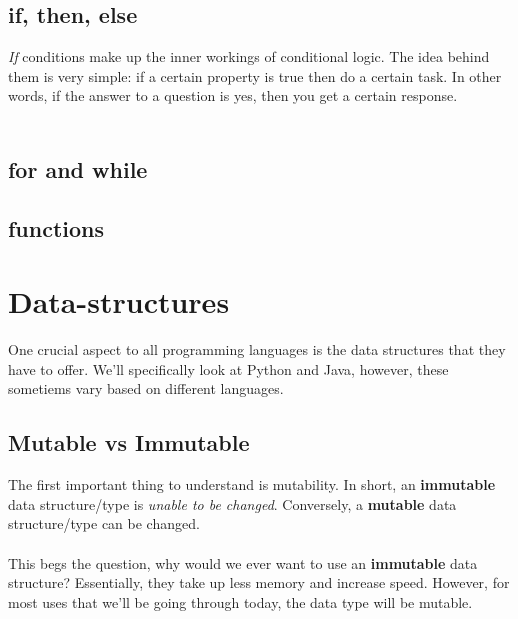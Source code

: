 \documentclass[12pt,a4paper]{book}
\begin{document}
		\section{if, then, else}
			\textit{If} conditions make up the inner workings of conditional logic. The idea behind them is very simple: if a certain property is true then do a certain task. In other words, if the answer to a question is yes, then you get a certain response.
			\\\\
		\section{for and while}
		\section{functions}
		
	\chapter{Data-structures}  \label{chap:datastructures}
		One crucial aspect to all programming languages is the data structures that they have to offer. We'll specifically look at Python and Java, however, these sometiems vary based on different  languages.
		\section{Mutable vs Immutable}
			The first important thing to understand is mutability. In short, an \textbf{immutable} data structure/type is \textit{unable to be changed}. Conversely, a \textbf{mutable} data structure/type can be changed.
			\\\\
			This begs the question, why would we ever want to use an \textbf{immutable} data structure? Essentially, they take up less memory and increase speed. However, for most uses that we'll be going through today, the data type will be mutable.
\end{document}
